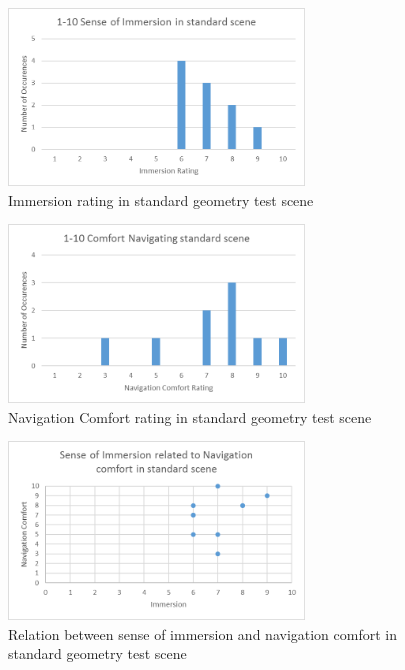 	\begin{figure}
		\label{exp:fig:standard_immersion}
		\includegraphics[width=0.7\textwidth]{Images/Standard_Immersion}
		\centering
		\caption{Immersion rating in standard geometry test scene}
	\end{figure}

	\begin{figure}
		\label{exp:fig:standard_comfort}
		\includegraphics[width=0.7\textwidth]{Images/Standard_Comfort}
		\centering
		\caption{Navigation Comfort rating in standard geometry test scene}
	\end{figure}

	\begin{figure}
		\label{exp:fig:standard_relation}
		\includegraphics[width=0.7\textwidth]{Images/Standard_Relation}
		\centering
		\caption{Relation between sense of immersion and navigation comfort in standard geometry test scene}
	\end{figure}

